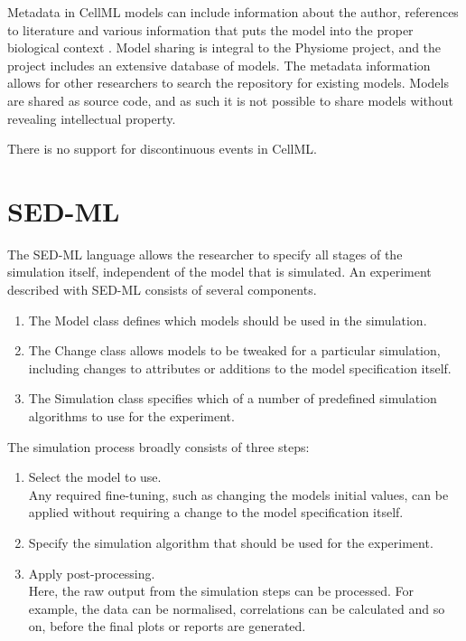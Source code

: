 \documentclass[\rootfolder/main.tex]{subfiles}
\begin{document}
Metadata in CellML models can include information about the author, references to literature and various information that puts the model into the proper biological context \cite{cuellar2003}.
Model sharing is integral to the Physiome project, and the project includes an extensive database of models.
The metadata information allows for other researchers to search the repository for existing models.
Models are shared as source code, and as such it is not possible to share models without revealing intellectual property.

There is no support for discontinuous events in CellML.

\section{SED-ML}

The SED-ML language allows the researcher to specify all stages of the simulation itself, independent of the model that is simulated.
An experiment described with SED-ML consists of several components.

\begin{enumerate}
    \item The Model class defines which models should be used in the simulation.
    \item The Change class allows models to be tweaked for a particular simulation, including changes to attributes or additions to the model specification itself.
    \item The Simulation class specifies which of a number of predefined simulation algorithms to use for the experiment. \cite{sedml-specification}
\end{enumerate}

The simulation process broadly consists of three steps:

\begin{enumerate}
    \item Select the model to use.\\
        Any required fine-tuning, such as changing the models initial values, can be applied without requiring a change to the model specification itself.
    \item Specify the simulation algorithm that should be used for the experiment.
    \item Apply post-processing.\\
        Here, the raw output from the simulation steps can be processed. For example, the data can be normalised,
        correlations can be calculated and so on, before the final plots or reports are generated.
\end{enumerate}
\end{document}
